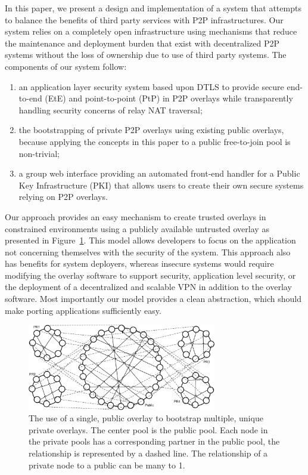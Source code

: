 \documentclass[conference]{IEEEtran}
\begin{document}
In this paper, we present a design and implementation of a system that attempts
to balance the benefits of third party services with P2P infrastructures.
Our system relies on a completely open infrastructure using mechanisms that
reduce the maintenance and deployment burden that exist with decentralized
P2P systems without the loss of ownership due to use of third party systems.
The components of our system follow:
\begin{enumerate}
\setlength{\itemsep}{0pt}
\setlength{\parskip}{0pt}
\item an application layer security system based upon DTLS to provide secure
end-to-end (EtE) and point-to-point (PtP) in P2P overlays while transparently
handling security concerns of relay NAT traversal;
\item the bootstrapping of private P2P overlays using existing public overlays,
because applying the concepts in this paper to a public free-to-join pool
is non-trivial;
\item a group web interface providing an automated front-end handler for a 
Public Key Infrastructure (PKI) that allows users to create their own secure
systems relying on P2P overlays.
\end{enumerate}

Our approach provides an easy mechanism to create trusted overlays in
constrained environments using a publicly available untrusted overlay as
presented in Figure~\ref{fig:subrings}.  This model allows developers to focus
on the application not concerning themselves with the security of the system.
This approach also has benefits for system deployers, whereas insecure systems
would require modifying the overlay software to support security, application
level security, or the deployment of a decentralized and scalable VPN in
addition to the overlay software.  Most importantly our model provides a clean
abstraction, which should make porting applications sufficiently easy.

\begin{figure}[h]
\centering
\includegraphics[width=3.25in]{subrings.eps}
\caption{The use of a single, public overlay to bootstrap multiple, unique
private overlays.  The center pool is the public pool.  Each node in the
private pools has a corresponding partner in the public pool, the relationship
is represented by a dashed line.  The relationship of a private node to a
public can be many to 1.}
\label{fig:subrings}
\end{figure}
\end{document}
